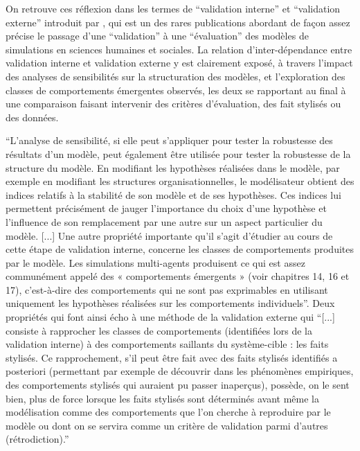 On retrouve ces réflexion dans les termes de \enquote{validation interne} et \enquote{validation externe} introduit par \autocite{Amblard2006}, qui est un des rares publications abordant de façon assez précise le passage d'une \enquote{validation} à une \enquote{évaluation} des modèles de simulations en sciences humaines et sociales. La relation d'inter-dépendance entre validation interne et validation externe y est clairement exposé, à travers l'impact des analyses de sensibilités sur la structuration des modèles, et l'exploration des classes de comportements émergentes observés, les deux se rapportant au final à une comparaison faisant intervenir des critères d'évaluation, des fait stylisés ou des données.

\enquote{L'analyse de sensibilité, si elle peut s'appliquer pour tester la robustesse des résultats d'un modèle, peut également être utilisée pour tester la robustesse de la structure du modèle. En modifiant les hypothèses réalisées dans le modèle, par exemple en modifiant les structures organisationnelles, le modélisateur obtient des indices relatifs à la stabilité de son modèle et de ses hypothèses. Ces indices lui permettent précisément de jauger l'importance du choix d’une hypothèse et l’influence de son remplacement par une autre sur un aspect particulier du modèle. [...] Une autre propriété importante qu'il s'agit d'étudier au cours de cette étape de validation interne, concerne les classes de comportements produites par le modèle. Les simulations multi-agents produisent ce qui est assez communément appelé des « comportements
émergents » (voir chapitres 14, 16 et 17), c'est-à-dire des comportements qui ne sont pas exprimables en utilisant uniquement les hypothèses réalisées sur les comportements individuels}. Deux propriétés qui font ainsi écho à une méthode de la validation externe qui \enquote{[...] consiste à rapprocher les classes de comportements (identifiées lors de la validation interne) à des comportements saillants du système-cible : les faits stylisés. Ce rapprochement, s’il peut être fait avec des faits stylisés identifiés a posteriori (permettant par exemple de découvrir dans les phénomènes empiriques, des comportements stylisés qui auraient pu passer inaperçus), possède, on le sent bien, plus de force lorsque les faits stylisés sont déterminés avant même la modélisation comme des comportements que l'on cherche à reproduire par le modèle ou dont on se servira comme un critère de validation parmi d'autres (rétrodiction).}

